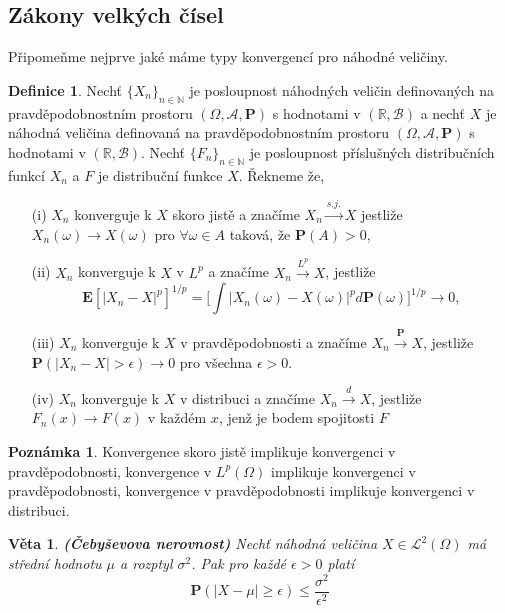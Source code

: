 \documentclass[a4]{report}
\newtheorem{theorem}{Věta}
\theoremstyle{definition}
\newtheorem{definition}{Definice}[section]
\newtheorem{remark}{Poznámka}[section]
\begin{document}
{\subsection{Zákony velkých čísel}
Připomeňme nejprve jaké máme typy konvergencí pro náhodné veličiny.
\begin{definition}
Nechť $\lbrace X_{n} \rbrace_{n \in \mathbb{N}}$ je posloupnost náhodných veličin definovaných na pravděpodobnostním prostoru $(\Omega, \mathcal{A}, \textbf{P})$ s hodnotami v $(\mathbb{R}, \mathcal{B})$ a nechť $X$ je náhodná veličina definovaná na pravděpodobnostním prostoru $(\Omega, \mathcal{A}, \textbf{P})$ s hodnotami v $(\mathbb{R}, \mathcal{B})$. Nechť $\lbrace F_{n} \rbrace_{n \in \mathbb{N}}$ je posloupnost příslušných distribučních funkcí $X_{n}$ a $F$ je distribuční funkce $X$.  Řekneme že,
\begin{itemize}
\item[(i)] $X_{n}$ konverguje k $X$ skoro jistě a značíme $X_{n} \xrightarrow{s.j.} X$ jestliže $X_{n}(\omega) \longrightarrow X(\omega)$ pro $\forall \omega \in A$ taková, že $\textbf{P}(A) > 0$,
\item[(ii)] $X_{n}$ konverguje k $X$ v $L^{p}$ a značíme $X_{n} \xrightarrow{L^{p}} X$, jestliže 
\begin{equation}
\mathbf{E}[|X_{n} - X|^{p}]^{1/p} = \bigg[ \int |X_{n}(\omega) - X(\omega)|^{p}d\textbf{P}(\omega)\bigg]^{1/p} \longrightarrow 0,
\end{equation}
\item[(iii)] $X_{n}$ konverguje k $X$ v pravděpodobnosti a značíme $X_{n} \xrightarrow{\mathbf{P}} X$, jestliže $\textbf{P}(|X_{n} - X| > \epsilon) \longrightarrow 0$ pro všechna $\epsilon > 0$.
\item[(iv)] $X_{n}$ konverguje k $X$ v distribuci a značíme $X_{n} \xrightarrow{d} X$, jestliže $F_{n}(x) \longrightarrow F(x)$ v každém $x$, jenž je bodem spojitosti $F$
\end{itemize}
\end{definition}

\begin{remark}
Konvergence skoro jistě implikuje konvergenci v pravděpodobnosti, konvergence v $L^{p}(\Omega)$ implikuje konvergenci v pravděpodobnosti, konvergence v pravděpodobnosti implikuje konvergenci v distribuci.
\end{remark}

\begin{theorem}\label{Chebychev1}{\textbf{(Čebyševova nerovnost)}}
Nechť náhodná veličina $X \in \mathcal{L}^{2}(\Omega)$ má střední hodnotu $\mu$ a rozptyl $\sigma^{2}$. Pak pro každé $\epsilon > 0$ platí
\begin{equation}
\textbf{P}(|X - \mu | \geq \epsilon) \leq \frac{\sigma^{2}}{\epsilon^{2}}
\end{equation}
\end{theorem}

}
\end{document}
